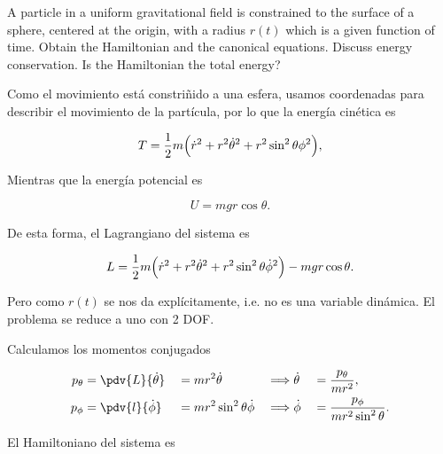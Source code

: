 \documentclass[../main.tex]{subfiles}
\begin{document}
\begin{problema}
	A particle in a uniform gravitational field is constrained to the surface
	of a sphere, centered at the origin, with a radius \(r(t)\) which is a
	given function of time. Obtain the Hamiltonian and the canonical equations.
	Discuss energy conservation. Is the Hamiltonian the total energy?

	\startsolution

	Como el movimiento está constriñido a una esfera, usamos coordenadas
	para describir el movimiento de la partícula, por lo que la energía cinética
	es

	\begin{equation*}
		T = \dfrac{1}{2}m\Bigl(\dot{r}^{2} + r^{2} \dot{\theta}^{2} + r^{2}\sin^{2}\theta \phi^{2}\Bigr),
	\end{equation*}

	Mientras que la energía potencial es

	\begin{equation*}
		U = mgr\cos\theta.
	\end{equation*}

	De esta forma, el Lagrangiano del sistema es

	\begin{equation*}
		L = \dfrac{1}{2}m \Bigl(\dot{r}^{2} + r^{2} \dot{\theta}^{2} + r^{2}\sin^{2}\theta \dot{\phi}^{2}\Bigr)
		- mgr\cos\theta.
	\end{equation*}

	Pero como \(r(t)\) se nos da explícitamente, i.e. no es una variable dinámica.
	El problema se reduce a uno con 2 DOF.

	Calculamos los momentos conjugados

	\begin{alignat*}{4}
		p_{\theta}   & = \pdv{L}{\dot{\theta}} & {}={}                                   & mr^{2} \dot{\theta}             & {}\Longrightarrow{} &
		\dot{\theta} & {}={}                   & \dfrac{p_{\theta}}{mr^{2}},                                                                       \\
		p_{\phi}     & = \pdv{l}{\dot{\phi}}   & {}={}                                   & mr^{2}\sin^{2}\theta \dot{\phi} & {}\Longrightarrow{} &
		\dot{\phi}   & {}={}                   & \dfrac{p_{\phi}}{mr^{2}\sin^{2}\theta}.
	\end{alignat*}

	El Hamiltoniano del sistema es


\end{problema}
\end{document}
